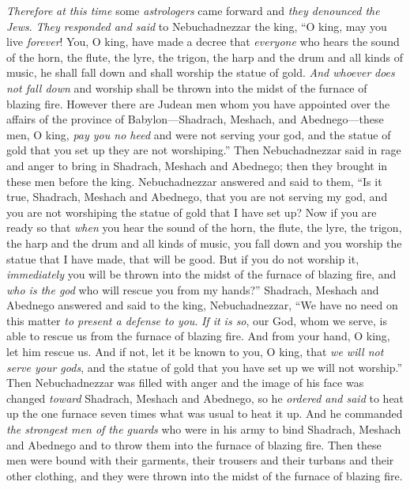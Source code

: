 \begin{biblechapter}
\verse \textit{Therefore} \textit{at this time} some \textit{astrologers} came forward and \textit{they denounced the Jews}.
\verse \textit{They responded and said} to Nebuchadnezzar the king, “O king, may you live \textit{forever}!
\verse You, O king, have made a decree that \textit{everyone} who hears the sound of the horn, the flute, the lyre, the trigon, the harp and the drum and all kinds of music, he shall fall down and shall worship the statue of gold.
\verse \textit{And whoever} \textit{does not fall down} and worship shall be thrown into the midst of the furnace of blazing fire.
\verse However there are Judean men whom you have appointed over the affairs of the province of Babylon—Shadrach, Meshach, and Abednego—these men, O king, \textit{pay you no heed} and were not serving your god, and the statue of gold that you set up they are not worshiping.”
\verse Then Nebuchadnezzar said in rage and anger to bring in Shadrach, Meshach and Abednego; then they brought in these men before the king.
\verse Nebuchadnezzar answered and said to them, “Is it true, Shadrach, Meshach and Abednego, that you are not serving my god, and you are not worshiping the statue of gold that I have set up?
\verse Now if you are ready so that \textit{when} you hear the sound of the horn, the flute, the lyre, the trigon, the harp and the drum and all kinds of music, you fall down and you worship the statue that I have made, that will be good. But if you do not worship it, \textit{immediately} you will be thrown into the midst of the furnace of blazing fire, and \textit{who is the god} who will rescue you from my hands?”
\verse Shadrach, Meshach and Abednego answered and said to the king, Nebuchadnezzar, “We have no need on this matter \textit{to present a defense to you}.
\verse \textit{If it is so}, our God, whom we serve, is able to rescue us from the furnace of blazing fire. And from your hand, O king, let him rescue us.
\verse And if not, let it be known to you, O king, that \textit{we will not serve your gods}, and the statue of gold that you have set up we will not worship.”
 Then Nebuchadnezzar was filled with anger and the image of his face was changed \textit{toward} Shadrach, Meshach and Abednego, so he \textit{ordered and said} to heat up the one furnace seven times what was usual to heat it up.
\verse And he commanded \textit{the strongest men of the guards} who were in his army to bind Shadrach, Meshach and Abednego and to throw them into the furnace of blazing fire.
\verse Then these men were bound with their garments, their trousers and their turbans and their other clothing, and they were thrown into the midst of the furnace of blazing fire.

\end{biblechapter}
